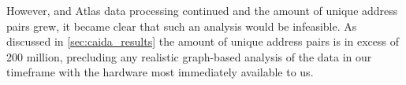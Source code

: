 However, \caida and \ripe Atlas data processing continued and the amount of unique \ip address pairs grew, it became clear that such an analysis would be infeasible. As discussed in \cref{sec:caida_results} the amount of unique \ip address pairs is in excess of 200 million, precluding any realistic graph-based analysis of the data in our timeframe with the hardware most immediately available to us.
